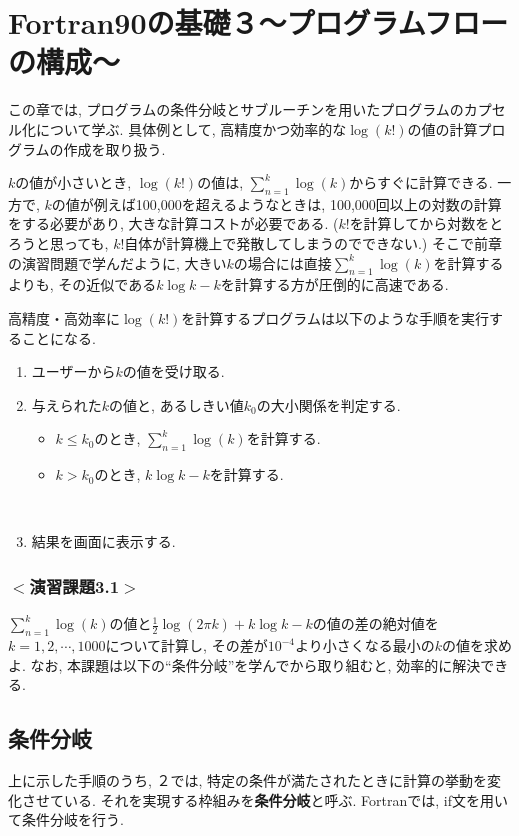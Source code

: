 \chapter{Fortran90の基礎３〜プログラムフローの構成〜}

この章では, プログラムの条件分岐とサブルーチンを用いたプログラムのカプセル化について学ぶ.
具体例として, 高精度かつ効率的な$\log(k!)$の値の計算プログラムの作成を取り扱う.

$k$の値が小さいとき, $\log(k!)$の値は, $\sum_{n=1}^{k}\log(k)$からすぐに計算できる.
一方で, $k$の値が例えば100,000を超えるようなときは, 100,000回以上の対数の計算をする必要があり,
大きな計算コストが必要である.
($k!$を計算してから対数をとろうと思っても, $k!$自体が計算機上で発散してしまうのでできない.)
そこで前章の演習問題で学んだように,
大きい$k$の場合には直接$\sum_{n=1}^{k}\log(k)$を計算するよりも,
その近似である$k\log{k}-k$を計算する方が圧倒的に高速である.

高精度・高効率に$\log(k!)$を計算するプログラムは以下のような手順を実行することになる.

\begin{enumerate}
  \item ユーザーから$k$の値を受け取る.
  \item 与えられた$k$の値と, あるしきい値$k_0$の大小関係を判定する.
  \begin{itemize}
    \item $k \leq k_0$のとき, $\sum_{n=1}^{k}\log(k)$を計算する.
    \item $k>k_0$のとき, $k\log{k}-k$を計算する.
  \end{itemize}
　\item 結果を画面に表示する.
\end{enumerate}


\subsection*{$<$演習課題3.1$>$}
$\sum_{n=1}^{k}\log(k)$の値と$\frac{1}{2}\log(2\pi k) + k\log{k}-k$の値の差の絶対値を
$k=1,2, \cdots, 1000$について計算し, その差が$10^{-4}$より小さくなる最小の$k$の値を求めよ. 
なお, 本課題は以下の``条件分岐''を学んでから取り組むと, 効率的に解決できる.


\section{条件分岐}
上に示した手順のうち, ２では, 特定の条件が満たされたときに計算の挙動を変化させている.
それを実現する枠組みを{\bfseries 条件分岐}と呼ぶ.
Fortranでは, {\ttfamily if}文を用いて条件分岐を行う.

